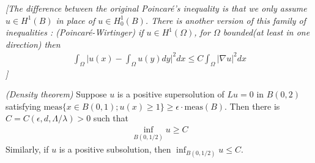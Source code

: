 \documentclass[12pt,a4paper]{article}
\begin{document}
\emph{[The difference between the original Poincar\'e's inequality is that we only assume $u\in H^1(B)$ in place of $u\in H_0^1(B)$. There is another version of this family of inequalities : (Poincar\'e-Wirtinger) if $u\in H^1(\Omega)$, for $\Omega$ bounded(at least in one direction) then
\begin{align*}
\int_{\Omega} \big| u(x) - \int_{\Omega} u(y) dy \big|^2 dx \leq C \int_{\Omega} |\nabla u|^2 dx
\end{align*}
]}
\s

\prop \emph{(Density theorem)} Suppose $u$ is a positive supersolution of $Lu =0$ in $B(0, 2)$ satisfying $\text{meas}\{x\in B(0,1) ; u(x) \geq 1 \} \geq \epsilon \cdot \text{meas}(B)$. Then there is $C= C(\epsilon, d, \Lambda/\lambda) >0$ such that
\begin{align*}
\inf_{B(0, 1/2)} u \geq C
\end{align*}
\quad Similarly, if $u$ is a positive subsolution, then $\inf_{B(0, 1/2)} u \leq C$.
\end{document}
